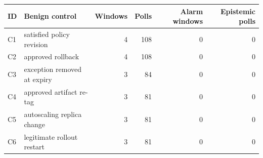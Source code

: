 \begin{tabular}{@{}llrrrr@{}}
\toprule
ID & Benign control & Windows & Polls & Alarm windows & Epistemic polls \\
\midrule
C1 & satisfied policy revision & 4 & 108 & 0 & 0 \\
C2 & approved rollback & 4 & 108 & 0 & 0 \\
C3 & exception removed at expiry & 3 & 84 & 0 & 0 \\
C4 & approved artifact re-tag & 3 & 81 & 0 & 0 \\
C5 & autoscaling replica change & 3 & 81 & 0 & 0 \\
C6 & legitimate rollout restart & 3 & 81 & 0 & 0 \\
\bottomrule
\end{tabular}

